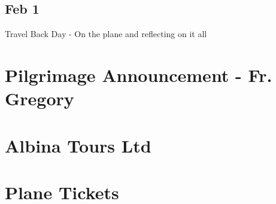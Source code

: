 \documentclass[letterpaper]{report}
\begin{document}
\section{Feb 1}
Travel Back Day - On the plane and reflecting on it all

\begin{appendix}
	\chapter{Pilgrimage Announcement - Fr. Gregory}
	\clearpage
	
	\chapter{Albina Tours Ltd}
	\clearpage
	
	\chapter{Plane Tickets}
	\clearpage
	

\end{appendix}
\end{document}
